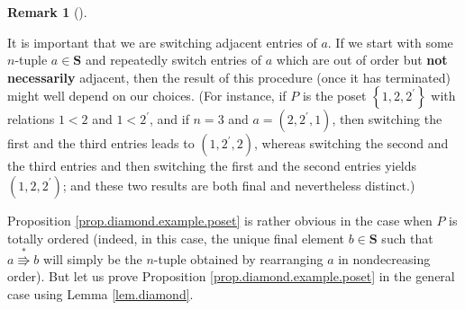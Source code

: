 \documentclass[numbers=enddot,12pt,final,onecolumn,notitlepage]{scrartcl}%
\theoremstyle{definition}
\newtheorem{remk}[theo]{Remark}
\newenvironment{remark}[1][]
{\begin{remk}[#1]\begin{leftbar}}
{\end{leftbar}\end{remk}}
\begin{document}
\begin{remark}
It is important that we are switching adjacent entries of $a$. If we start
with some $n$-tuple $a\in\mathbf{S}$ and repeatedly switch entries of $a$
which are out of order but \textbf{not necessarily} adjacent, then the result
of this procedure (once it has terminated) might well depend on our choices.
(For instance, if $P$ is the poset $\left\{  1,2,2^{\prime}\right\}  $ with
relations $1<2$ and $1<2^{\prime}$, and if $n=3$ and $a=\left(  2,2^{\prime
},1\right)  $, then switching the first and the third entries leads to
$\left(  1,2^{\prime},2\right)  $, whereas switching the second and the third
entries and then switching the first and the second entries yields $\left(
1,2,2^{\prime}\right)  $; and these two results are both final and
nevertheless distinct.)
\end{remark}

Proposition \ref{prop.diamond.example.poset} is rather obvious in the case
when $P$ is totally ordered (indeed, in this case, the unique final element
$b\in\mathbf{S}$ such that $a\overset{\ast}{\Rrightarrow}b$ will simply be the
$n$-tuple obtained by rearranging $a$ in nondecreasing order). But let us
prove Proposition \ref{prop.diamond.example.poset} in the general case using
Lemma \ref{lem.diamond}.
\end{document}
